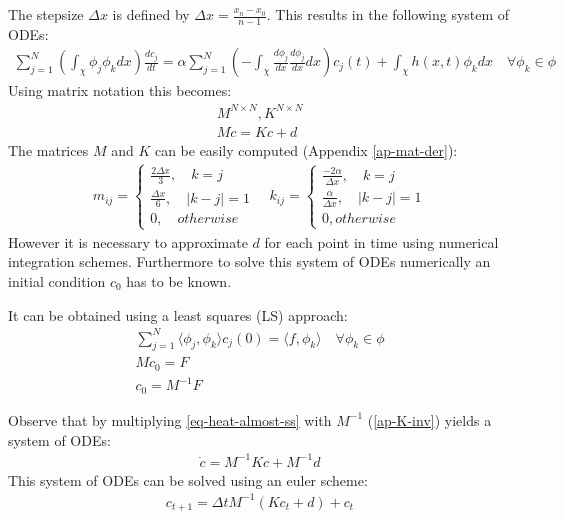 The stepsize \(\Delta x\) is defined by \(\Delta x = \frac{x_n - x_0}{n-1}\). \label{def-delta-x}
This results in the following system of ODEs:
\begin{gather}
\sum_{j=1}^N(\int_{\chi} \phi_{j}\phi_{k}dx)\frac{dc_{j}}{dt} = \alpha \sum_{j = 1}^N(-\int_{\chi} \frac{d\phi_{j}}{dx}\frac{d\phi_{j}}{dx}dx)c_{j}(t) + \int_{\chi}h(x, t) \phi_{k} dx
\quad \forall \phi_{k} \in \phi \label{eq-heat-fem}
\end{gather}
Using matrix notation this becomes:
\begin{gather}
M^{N \times N}, K^{N \times N} \\
M\dot{c} = Kc + d \label{eq-heat-almost-ss}
\end{gather}
The matrices \(M\) and \(K\) can be easily computed (Appendix \ref{ap-mat-der}):
\begin{gather}
m_{ij} = \begin{cases}
\frac{2\Delta x}{3}, \quad k = j \\
\frac{\Delta x}{6}, \quad |k - j| = 1 \\
0, \quad otherwise 
\end{cases} \label{def-mat-a}
\quad
k_{ij} = \begin{cases}
\frac{-2\alpha}{\Delta x}, \quad k = j \\
\frac{\alpha}{\Delta x}, \quad |k - j| = 1 \\
0, otherwise
\end{cases}
\end{gather}
However it is necessary to approximate \(d\) for each point in time using numerical integration schemes.
Furthermore to solve this system of ODEs numerically an initial condition \(c_{0}\) has to be known.
\cite{Gustafsson2011b}


It can be obtained using a least squares (LS) approach:
\begin{gather}
\sum_{j = 1}^N \langle \phi_j, \phi_k \rangle c_{j}(0) = \langle f, \phi_{k} \rangle \quad \forall \phi_k \in \phi \\
Mc_{0} = F \label{F}\\ 
c_{0} = M^{-1}F  \label{c0}
\end{gather}
\cite{Gustafsson2011c}

Observe that by multiplying \ref{eq-heat-almost-ss} with \(M^{-1}\) (\ref{ap-K-inv}) yields a system of ODEs:
\begin{gather}
\dot{c} = M^{-1}Kc + M^{-1}d \label{almost-almost-ss}
\end{gather}
This system of ODEs can be solved using an euler scheme:
\begin{gather}
c_{t+1} = \Delta t M^{-1}(Kc_{t} + d) + c_{t} \label{fem-euler}
\end{gather}
